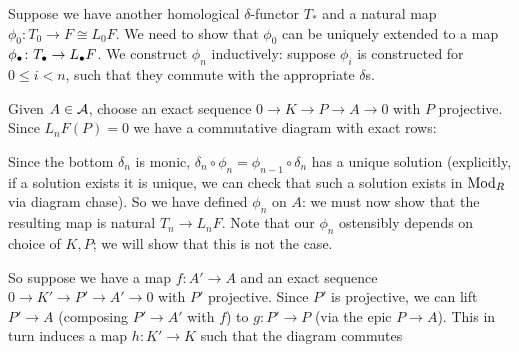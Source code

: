 \ethrm

\bproof

    Suppose we have another homological $\delta$-functor $T_*$ and a natural map $\phi_0\colon T_0\to F\cong L_0F$.
    We need to show that $\phi_0$ can be uniquely extended to a map $\phi_\bullet\colon T_\bullet\to L_\bullet F$.
    We construct $\phi_n$ inductively: suppose $\phi_i$ is constructed for $0\leq i<n$, such that they commute with the appropriate $\delta$s.

    Given $A\in{{\cal A}}$, choose an exact sequence $0\to K\to P\to A\to0$ with $P$ projective.
    Since $L_nF(P)=0$ we have a commutative diagram with exact rows:

    \centerline{}

    Since the bottom $\delta_n$ is monic, $\delta_n\circ\phi_n=\phi_{n-1}\circ\delta_n$ has a unique solution (explicitly, if a solution exists it is unique,
    we can check that such a solution exists in ${\rm Mod}_R$ via diagram chase).
    So we have defined $\phi_n$ on $A$: we must now show that the resulting map is natural $T_n\to L_nF$.
    Note that our $\phi_n$ ostensibly depends on choice of $K,P$; we will show that this is not the case.

    So suppose we have a map $f\colon A'\to A$ and an exact sequence $0\to K'\to P'\to A'\to0$ with $P'$ projective.
    Since $P'$ is projective, we can lift $P'\to A$ (composing $P'\to A'$ with $f$) to $g\colon P'\to P$ (via the epic $P\to A$).
    This in turn induces a map $h\colon K'\to K$ such that the diagram commutes

    \centerline{}

